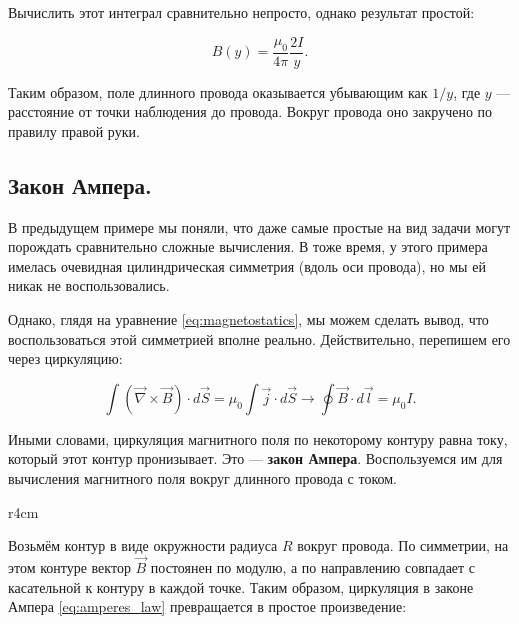 \documentclass[a4paper,12pt]{article}
\numberwithin{equation}{section}
\newcommand{\vn}{\vec{\nabla}}
\begin{document}
Вычислить этот интеграл сравнительно непросто, однако результат простой: 

\begin{equation}
  \label{eq:wire_current_3}
  B(y) = \frac{\mu_0}{4\pi} \frac{2I}{y}.
\end{equation}

Таким образом, поле длинного провода оказывается убывающим как $1/y$,
где $y$ --- расстояние от точки наблюдения до провода. Вокруг провода
оно закручено по правилу правой руки. 

\subsection{Закон Ампера.}
\label{sec:amperes_law}

В предыдущем примере мы поняли, что даже самые простые на вид задачи
могут порождать сравнительно сложные вычисления. В тоже время, у этого
примера имелась очевидная цилиндрическая симметрия (вдоль оси
провода), но мы ей никак не воспользовались. 

Однако, глядя на уравнение \eqref{eq:magnetostatics}, мы можем сделать
вывод, что воспользоваться этой симметрией вполне
реально. Действительно, перепишем его через циркуляцию: 

\begin{equation}
  \label{eq:amperes_law}
  \int \left( \vn \times \vec{B} \right) \cdot d \vec{S} =
  \mu_0 \int \vec{j} \cdot d\vec{S} \rightarrow  \oint
  \vec{B} \cdot d\vec{l} = \mu_0 I.
\end{equation}

Иными словами, циркуляция магнитного поля по некоторому контуру равна
току, который этот контур пронизывает. Это --- \textbf{закон
  Ампера}. Воспользуемся им для вычисления магнитного поля вокруг
длинного провода с током. 

\begin{wrapfigure}{r}{4cm}
\centering
{}
\label{fig:current_wire_field}
\end{wrapfigure}

Возьмём контур в виде окружности радиуса $R$ вокруг провода. По
симметрии, на этом контуре вектор $\vec{B}$ постоянен по модулю, а по
направлению совпадает с касательной к контуру в каждой точке. Таким
образом, циркуляция в законе Ампера \eqref{eq:amperes_law}
превращается в простое произведение:
\end{document}
